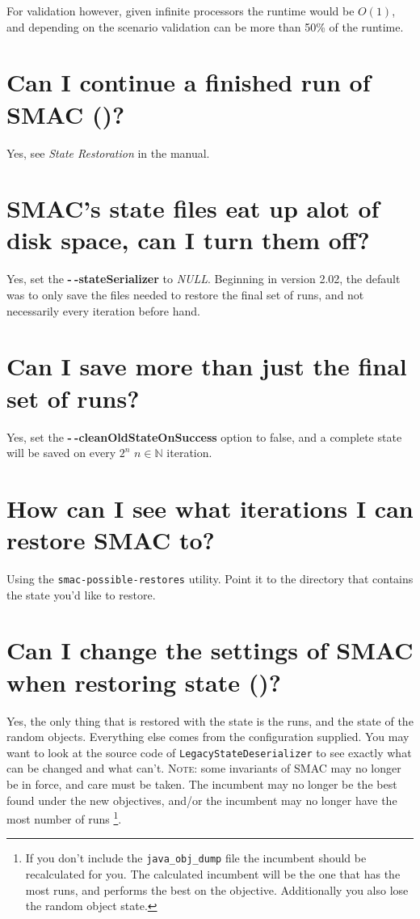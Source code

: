 \documentclass[11pt,letterpaper,oneside]{article}
\begin{document}
	For validation however, given infinite processors the runtime would be $O(1)$, and depending on the scenario validation can be more than 50\% of the runtime.

\section{Can I continue a finished run of SMAC ()?}

	Yes, see \emph{State Restoration} in the manual.


\section{SMAC's state files eat up alot of disk space, can I turn them off?}

	Yes, set the \textbf{-$~\!$-stateSerializer} to \emph{NULL}. Beginning in version 2.02, the default was to only save the files needed to restore the final set of runs, and not necessarily every iteration before hand.
	
\section{Can I save more than just the final set of runs?}
	Yes, set the \textbf{-$~\!$-cleanOldStateOnSuccess} option to false, and a complete state will be saved on every $2^n$  $n\in\mathbb{N}$ iteration.

\section{How can I see what iterations I can restore SMAC to?}

	Using the \texttt{smac-possible-restores} utility. Point it to the directory that contains the state you'd like to restore.

\section{Can I change the settings of SMAC when restoring state ()?}

	Yes, the only thing that is restored with the state is the runs, and the state of the random objects. Everything else comes from the configuration supplied. You may want to look at the source code of \texttt{LegacyStateDeserializer} to see exactly what can be changed and what can't. \textsc{Note:} some invariants of SMAC may no longer be in force, and care must be taken. The incumbent may no longer be the best found under the new objectives, and/or the incumbent may no longer have the most number of runs \footnote{If you don't include the \texttt{java\_obj\_dump} file the incumbent should be recalculated for you. The calculated incumbent will be the one that has the most runs, and performs the best on the objective. Additionally you also lose the random object state.}. 
\end{document}
